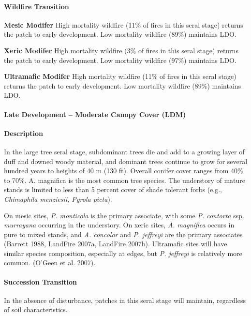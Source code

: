 \paragraph{Wildfire Transition}
\begin{adjustwidth}{2cm}{}
\textbf{Mesic Modifer } High mortality wildfire (11\% of fires in this seral stage) returns the patch to early development. Low mortality wildfire (89\%) maintains LDO. 

\textbf{Xeric Modifer} High mortality wildfire (3\% of fires in this seral stage) returns the patch to early development. Low mortality wildfire (97\%) maintains LDO. 

\textbf{Ultramafic Modifer} High mortality wildfire (11\% of fires in this seral stage) returns the patch to early development. Low mortality wildfire (89\%) maintains LDO.

\end{adjustwidth}

\noindent\hrulefill

\paragraph{Late Development – Moderate Canopy Cover (LDM)}

\paragraph{Description} In the large tree seral stage, subdominant trees die and add to a growing layer of duff and downed woody material, and dominant trees continue to grow for several hundred years to heights of 40 m (130 ft). Overall conifer cover ranges from 40\% to 70\%. A. magnifica is the most common tree species. The understory of mature stands is limited to less than 5 percent cover of shade tolerant forbs (e.g., \emph{Chimaphila menziesii, Pyrola picta}). 

On mesic sites, \emph{P. monticola} is the primary associate, with some \emph{P. contorta} ssp. \emph{murrayana} occurring in the understory. On xeric sites, \emph{A. magnifica} occurs in pure to mixed stands, and \emph{A. concolor} and \emph{P. jeffreyi} are the primary associates (Barrett 1988, LandFire 2007a, LandFire 2007b). Ultramafic sites will have similar species composition, especially at edges, but \emph{P. jeffreyi} is relatively more common. (O’Geen et al. 2007).


\paragraph{Succession Transition} In the absence of disturbance, patches in this seral stage will maintain, regardless of soil characteristics.

